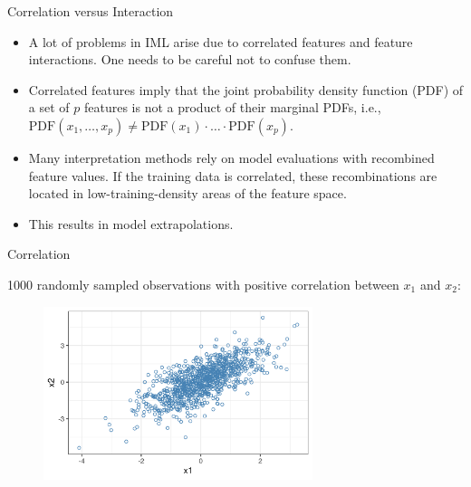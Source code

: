 \documentclass[11pt,compress,t,notes=noshow, aspectratio=169, xcolor=table]{beamer}
\begin{document}
\begin{vbframe}{Correlation versus Interaction}
\begin{itemize}
\itemsep2em
\item A lot of problems in IML arise due to correlated features and feature interactions. One needs to be careful not to confuse them.
\item Correlated features imply that the joint probability density function (PDF) of a set of $p$ features is not a product of their marginal PDFs, i.e., $\text{PDF}(x_1, \dots, x_p) \neq \text{PDF}(x_1) \cdot \ldots \cdot \text{PDF}(x_p)$.
\item
Many interpretation methods rely on model evaluations with recombined feature values. If the training data is correlated, these recombinations are located in low-training-density areas of the feature space.
\item This results in model extrapolations.
\end{itemize}
\end{vbframe}

\begin{vbframe}{Correlation}

1000 randomly sampled observations with positive correlation between $x_1$ and $x_2$:
\medskip
\begin{figure}
\includegraphics[width = 0.7\textwidth]{figure/correlation}
\end{figure}
\end{vbframe}
\end{document}
